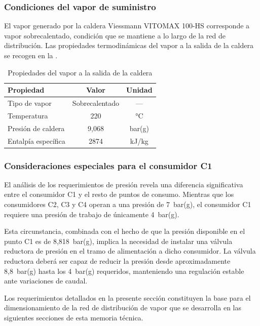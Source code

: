 \documentclass[12pt]{article}
\begin{document}
\subsubsection{Condiciones del vapor de suministro}

El vapor generado por la caldera Viessmann VITOMAX 100-HS corresponde a vapor sobrecalentado, condición que se mantiene a lo largo de la red de distribución. Las propiedades termodinámicas del vapor a la salida de la caldera se recogen en la .

\begin{table}[H]
	\centering
	\caption{Propiedades del vapor a la salida de la caldera}
	\label{tab:condiciones-vapor}
	\begin{tabular}{lcc}
		\toprule
		\textbf{Propiedad}  & \textbf{Valor} & \textbf{Unidad} \\
		\midrule
		Tipo de vapor       & Sobrecalentado & ---             \\
		Temperatura         & 220            & °C              \\
		Presión de caldera  & 9,068          & bar(g)          \\
		Entalpía específica & 2874           & kJ/kg           \\
		\bottomrule
	\end{tabular}
\end{table}

\subsubsection{Consideraciones especiales para el consumidor C1}

El análisis de los requerimientos de presión revela una diferencia significativa entre el consumidor C1 y el resto de puntos de consumo. Mientras que los consumidores C2, C3 y C4 operan a una presión de 7~bar(g), el consumidor C1 requiere una presión de trabajo de únicamente 4~bar(g).

Esta circunstancia, combinada con el hecho de que la presión disponible en el punto C1 es de 8,818~bar(g), implica la necesidad de instalar una válvula reductora de presión en el tramo de alimentación a dicho consumidor. La válvula reductora deberá ser capaz de reducir la presión desde aproximadamente 8,8~bar(g) hasta los 4~bar(g) requeridos, manteniendo una regulación estable ante variaciones de caudal.

Los requerimientos detallados en la presente sección constituyen la base para el dimensionamiento de la red de distribución de vapor que se desarrolla en las siguientes secciones de esta memoria técnica.
\end{document}
